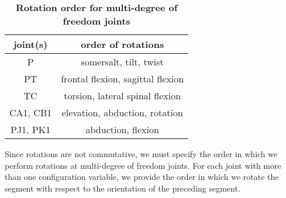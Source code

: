 \documentclass[10pt]{article}
\begin{document}
\begin{table}[!ht]
\caption{
\bf{Rotation order for multi-degree of freedom joints}}
\begin{tabular}{|c|c|}
    \hline
    \textbf{joint(s)} & \textbf{order of rotations}\\
    \hline
    P & somersalt, tilt, twist \\
    \hline
    PT & frontal flexion, sagittal flexion \\
    \hline
    TC & torsion, lateral spinal flexion \\
    \hline
    CA1, CB1 & elevation, abduction, rotation \\
    \hline
    PJ1, PK1 & abduction, flexion \\
    \hline
\end{tabular}
\begin{flushleft}Since rotations are not commutative, we must specify the order
    in which we perform rotations at multi-degree of freedom joints. For each
    joint with more than one configuration variable, we provide the order in
    which we rotate the segment with respect to the orientation of the
    preceding segment.
\end{flushleft}
\label{tab:dof}
\end{table}
\end{document}
